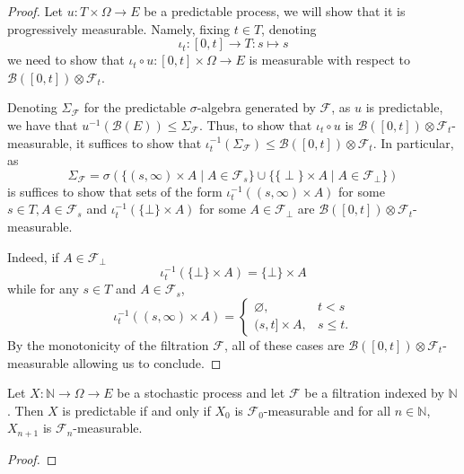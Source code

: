 \begin{proof}\leanok
    Let $u : T \times \Omega \to E$ be a predictable process, we will show that it is progressively measurable. Namely, fixing $t \in T$, denoting
    $$\iota_t : [0, t] \to T : s \mapsto s$$
    we need to show that $\iota_t \circ u : [0, t] \times \Omega \to E$ is measurable with respect to $\mathcal{B}([0, t]) \otimes \mathcal{F}_t$.

    Denoting $\Sigma_\mathcal{F}$ for the predictable $\sigma$-algebra generated by $\mathcal{F}$, as $u$ is predictable, we have that $u^{-1}(\mathcal{B}(E)) \le \Sigma_\mathcal{F}$. Thus, to show that $\iota_t \circ u$ is $\mathcal{B}([0, t]) \otimes \mathcal{F}_t$-measurable, it suffices to show that $\iota_t^{-1}(\Sigma_\mathcal{F}) \le \mathcal{B}([0, t]) \otimes \mathcal{F}_t$. In particular, as
    $$\Sigma_\mathcal{F} = \sigma(\{(s, \infty) \times A \mid A \in \mathcal{F}_s\} \cup \{\{\perp\} \times A \mid A \in \mathcal{F}_\perp\})$$
    is suffices to show that sets of the form $\iota_t^{-1}((s, \infty) \times A)$ for some $s \in T, A \in \mathcal{F}_s$ and $\iota_t^{-1}(\{\bot\} \times A)$ for some $A \in \mathcal{F}_\bot$ are $\mathcal{B}([0, t]) \otimes \mathcal{F}_t$-measurable.

    Indeed, if $A \in \mathcal{F}_\bot$
    $$\iota_t^{-1}(\{\bot\} \times A) = \{\bot\} \times A$$
    while for any $s \in T$ and $A \in \mathcal{F}_s$,
    $$\iota_t^{-1}((s, \infty) \times A) = \begin{cases}
        \varnothing, & t < s\\
        (s, t] \times A, & s \le t.
    \end{cases}$$
    By the monotonicity of the filtration $\mathcal{F}$, all of these cases are $\mathcal{B}([0, t]) \otimes \mathcal{F}_t$-measurable allowing us to conclude.
\end{proof}


\begin{lemma}\label{lem:predictable_nat_iff}
  \leanok
Let $X : \mathbb{N} \to \Omega \to E$ be a stochastic process and let $\mathcal{F}$ be a filtration indexed by $\mathbb{N}$.
Then $X$ is predictable if and only if $X_0$ is $\mathcal{F}_0$-measurable and for all $n \in \mathbb{N}$, $X_{n+1}$ is $\mathcal{F}_n$-measurable.
\end{lemma}

\begin{proof}

\end{proof}



